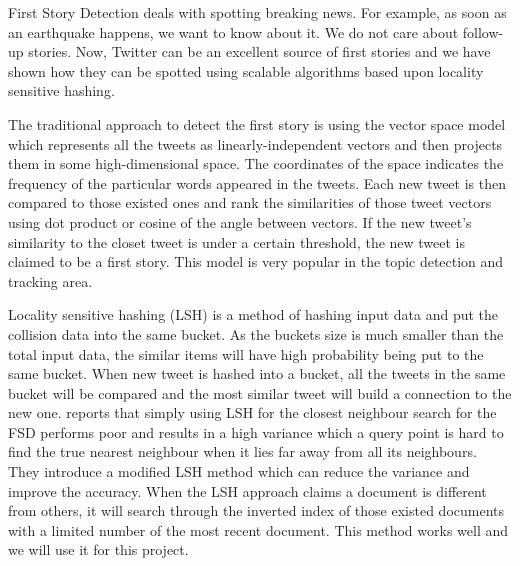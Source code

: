 \documentclass[a4paper,12pt]{article}
\begin{document}
First Story Detection deals with spotting breaking news. For example, as soon as an earthquake happens, we want to know about it. We do not care about follow-up stories. Now, Twitter can be an excellent source of first stories and we have shown how they can be spotted using scalable algorithms based upon locality sensitive hashing. \newline


The traditional approach to detect the first story is using the vector space model which represents all the tweets as linearly-independent vectors and then projects them in some high-dimensional space. The coordinates of the space indicates the frequency of the particular words appeared in the tweets. Each new tweet is then compared to those existed ones and rank the similarities of those tweet vectors using dot product or cosine of the angle between vectors. If the new tweet’s similarity to the closet tweet is under a certain threshold, the new tweet is claimed to be a first story. This model is very popular in the topic detection and tracking area. \newline

Locality sensitive hashing (LSH) is a method of hashing input data and put the collision data into the same bucket. As the buckets size is much smaller than the total input data, the similar items will have high probability being put to the same bucket. When new tweet is hashed into a bucket, all the tweets in the same bucket will be compared and the most similar tweet will build a connection to the new one. 
\citep{Petrovic:2010} reports that simply using LSH for the closest neighbour search for the FSD performs poor and results in a high variance which a query point is hard to find the true nearest neighbour when it lies far away from all its neighbours. They introduce a modified LSH method which can reduce the variance and improve the accuracy. When the LSH approach claims a document is different from others, it will search through the inverted index of those existed documents with a limited number of the most recent document. This method works well and we will use it for this project. \newline
\end{document}
